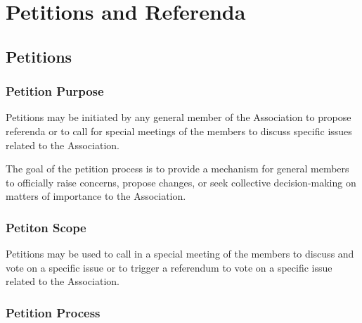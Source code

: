 \chapter{Petitions and Referenda}

\section{Petitions}

\subsection{Petition Purpose}
Petitions may be initiated by any general member of the Association
to propose referenda or to call for special meetings of the members 
to discuss specific issues related to the Association.

The goal of the petition process is to provide a mechanism for 
general members to officially raise concerns, propose changes, 
or seek collective decision-making on matters of importance 
to the Association.

\subsection{Petiton Scope}
Petitions may be used to call in a special meeting of the members 
to discuss and vote on a specific issue or to trigger a 
referendum to vote on a specific issue related to the Association.

\subsection{Petition Process}\label{petition-process}

